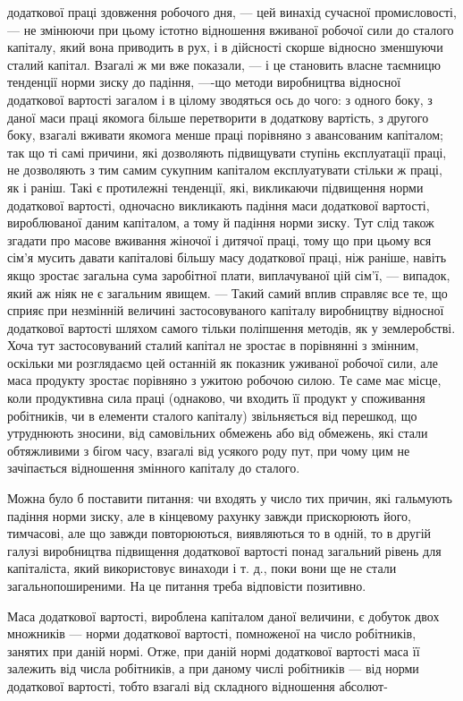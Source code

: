 додаткової праці здовження робочого дня, — цей винахід сучасної промисловості, — не змінюючи при
цьому істотно відношення вживаної робочої сили до сталого капіталу, який вона приводить в рух, і в
дійсності скорше відносно зменшуючи сталий капітал. Взагалі ж ми вже показали, — і це становить
власне таємницю тенденції норми зиску до падіння, —-що методи виробництва відносної додаткової
вартості загалом і в цілому зводяться ось до чого: з одного боку, з даної маси праці якомога більше
перетворити в додаткову вартість, з другого боку, взагалі вживати якомога менше праці порівняно з
авансованим капіталом; так що ті самі причини, які дозволяють підвищувати ступінь експлуатації
праці, не дозволяють з тим самим сукупним капіталом експлуатувати стільки ж праці, як і раніш. Такі
є протилежні тенденції, які, викликаючи підвищення норми додаткової вартості, одночасно викликають
падіння маси додаткової вартості, вироблюваної даним капіталом, а тому й падіння норми зиску. Тут
слід також згадати про масове вживання жіночої і дитячої праці, тому що при цьому вся сім’я мусить
давати капіталові більшу масу додаткової праці, ніж раніше, навіть якщо зростає загальна сума
заробітної плати, виплачуваної цій сім’ї, — випадок, який аж ніяк не є загальним явищем. — Такий
самий вплив справляє все те, що сприяє при незмінній величині застосовуваного капіталу виробництву
відносної додаткової вартості шляхом самого тільки поліпшення методів, як у землеробстві. Хоча тут
застосовуваний сталий капітал не зростає в порівнянні з змінним, оскільки ми розглядаємо цей
останній як показник уживаної робочої сили, але маса продукту зростає порівняно з ужитою робочою
силою. Те саме має місце, коли продуктивна сила праці (однаково, чи входить її продукт у споживання
робітників, чи в елементи сталого капіталу) звільняється від перешкод, що утруднюють зносини, від
самовільних обмежень або від обмежень, які стали обтяжливими з бігом часу, взагалі від усякого роду
пут, при чому цим не зачіпається відношення змінного капіталу до сталого.

Можна було б поставити питання: чи входять у число тих причин, які гальмують падіння норми зиску,
але в кінцевому рахунку завжди прискорюють його, тимчасові, але що завжди повторюються, виявляються
то в одній, то в другій галузі виробництва підвищення додаткової вартості понад загальний рівень для
капіталіста, який використовує винаходи і т. д., поки вони ще не стали загальнопоширеними. На це
питання треба відповісти позитивно.

Маса додаткової вартості, вироблена капіталом даної величини, є добуток двох множників — норми
додаткової вартості, помноженої на число робітників, занятих при даній нормі. Отже, при даній нормі
додаткової вартості маса її залежить від числа
робітників, а при даному числі робітників — від норми додаткової вартості, тобто взагалі від
складного відношення абсолют-
